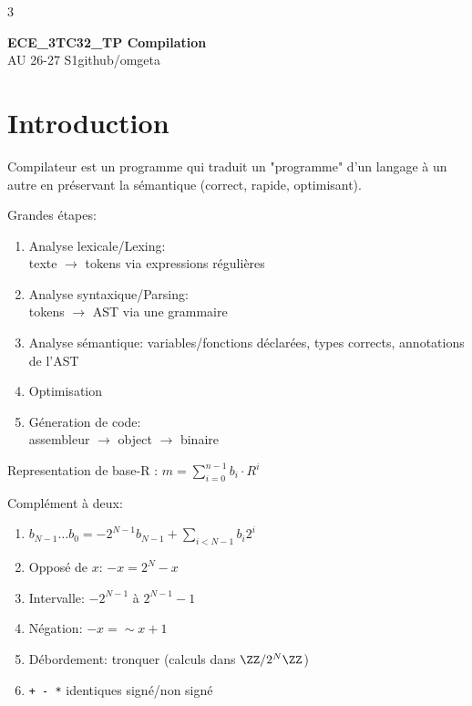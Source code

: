 \documentclass[12pt, a4paper]{article}
\newcommand{\mytitle}{ECE\_3TC32\_TP Compilation}
\newcommand{\myauthor}{github/omgeta}
\newcommand{\mydate}{AU 26-27 S1}
\begin{document}
\raggedright
\raggedcolumns
\footnotesize
\begin{multicols*}{3}
	\setlength{\premulticols}{1pt}
	\setlength{\postmulticols}{1pt}
	\setlength{\multicolsep}{1pt}
	\setlength{\columnsep}{2pt}

	{\normalsize{\textbf{\mytitle}}}\\
	{\footnotesize{\mydate\hspace{2pt}\textemdash\hspace{2pt}\myauthor}}
	\section{Introduction}

	Compilateur est un programme qui traduit un "programme" d'un langage à un autre en préservant la sémantique (correct, rapide, optimisant).

	Grandes étapes:
	\begin{enumerate}[\roman*.]
		\item Analyse lexicale/Lexing:\\texte $\rightarrow$ tokens via expressions régulières
		\item Analyse syntaxique/Parsing:\\tokens $\rightarrow$ AST via une grammaire
		\item Analyse sémantique: variables/fonctions déclarées, types corrects, annotations de l'AST
		\item Optimisation
		\item Géneration de code:\\assembleur $\rightarrow$ object $\rightarrow$ binaire
	\end{enumerate}

	Representation de base-R : $\displaystyle m = \sum^{n-1}_{i=0} b_i \cdot R^i$

	Complément à deux:
	\begin{enumerate}[\roman*.]
		\item $b_{N-1}\ldots b_0 = -2^{N-1}b_{N-1}+\sum_{i<N-1}b_i2^i$
		\item Opposé de $x$: $-x = 2^N - x$
		\item Intervalle: $-2^{N-1}$ à $2^{N-1}-1$
		\item Négation: $-x = \sim x+1$
		\item Débordement: tronquer (calculs dans $\ZZ/2^N\ZZ$)
		\item \lstinline|+ - *| identiques signé/non signé
	\end{enumerate}


\end{multicols*}
\end{document}

